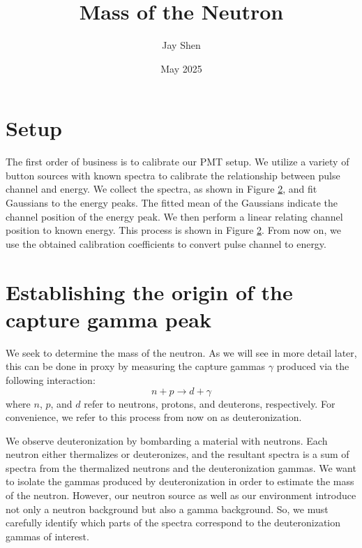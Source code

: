 \documentclass[12pt, letterpaper]{article}
\title{Mass of the Neutron}
\author{Jay Shen}
\date{May 2025}
\begin{document}
\maketitle

\section{Setup}

The first order of business is to calibrate our PMT setup. We utilize a variety of button sources with known spectra to calibrate the relationship between pulse channel and energy. We collect the spectra, as shown in Figure \ref{}, and fit Gaussians to the energy peaks. The fitted mean of the Gaussians indicate the channel position of the energy peak. We then perform a linear relating channel position to known energy. This process is shown in Figure \ref{}. From now on, we use the obtained calibration coefficients to convert pulse channel to energy. 

\section{Establishing the origin of the capture gamma peak}

We seek to determine the mass of the neutron. As we will see in more detail later, this can be done in proxy by measuring the capture gammas $\gamma$ produced via the following interaction:
\[
n + p \rightarrow d + \gamma
\]
where $n$, $p$, and $d$ refer to neutrons, protons, and deuterons, respectively. For convenience, we refer to this process from now on as deuteronization. 

We observe deuteronization by bombarding a material with neutrons. Each neutron either thermalizes or deuteronizes, and the resultant spectra is a sum of spectra from the thermalized neutrons and the deuteronization gammas. We want to isolate the gammas produced by deuteronization in order to estimate the mass of the neutron. However, our neutron source as well as our environment introduce not only a neutron background but also a gamma background. So, we must carefully identify which parts of the spectra correspond to the deuteronization gammas of interest. 
\end{document}
